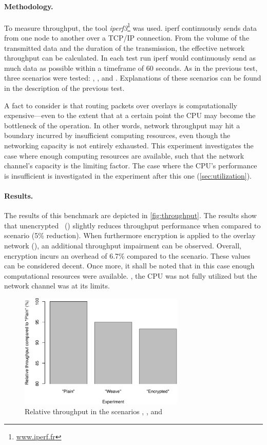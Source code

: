 \paragraph{Methodology.} To measure throughput, the tool \emph{iperf3}\footnote{\url{www.iperf.fr}} was used. iperf continuously sends data from one node to another over a TCP/IP connection. From the volume of the transmitted data and the duration of the transmission, the effective network throughput can be calculated. In each test run iperf would continuously send as much data as possible within a timeframe of 60 seconds. As in the previous test, three scenarios were tested:  , , and . Explanations of these scenarios can be found in the description of the previous test. 

A fact to consider is that routing packets over overlays is computationally expensive---even to the extent that at a certain point the CPU may become the bottleneck of the operation. In other words, network throughput may hit a boundary incurred by insufficient computing resources, even though the networking capacity is not entirely exhausted. This experiment investigates the case where enough computing resources are available, such that the network channel's capacity is the limiting factor. The case where the CPU's performance is insufficient is investigated in the experiment after this one (\cf \ref{sec:utilization}).

\paragraph{Results.}
The results of this benchmark are depicted in \autoref{fig:throughput}. The results show that unencrypted \wnet\ () slightly reduces throughput performance when compared to  scenario (5\% reduction). When furthermore encryption is applied to the overlay network (), an additional throughput impairment can be observed. Overall, encryption incurs an overhead of 6.7\% compared to the  scenario. These values can be considered decent. Once more, it shall be noted that in this case enough computational resources were available. \Ie , the CPU was not fully utilized but the network channel was at its limits.
\begin{figure}[htpb]
  \centering
  \includegraphics[width=0.7\textwidth]{figures/throughput}
  \caption[\weave\ throughput benchmark results]{Relative throughput in the scenarios , , and }\label{fig:throughput}
\end{figure} 
%
%
%
%
%
%
%
%
%
%
